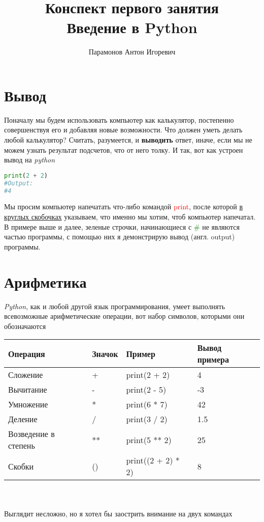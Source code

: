 \documentclass[12pt]{article} %
\newcommand \tab[1][1cm]{\hspace*{#1}}
\begin{document}
\title{Конспект первого занятия\\
	\large Введение в Python}
\author{Парамонов Антон Игоревич}
\maketitle
\section{Вывод}
\tab Поначалу мы будем использовать компьютер как калькулятор, постепенно совершенствуя его и добавляя новые возможности. Что должен уметь делать любой калькулятор? Считать, разумеется, и \textbf{выводить} ответ, иначе, если мы не можем узнать результат подсчетов, что от него толку. И так, вот как устроен вывод на \textit{python}
\begin{lstlisting}[language=Python]
print(2 + 2)
#Output: 
#4
\end{lstlisting}
\tab Мы просим компьютер напечатать что-либо командой \textcolor{red}{print}, после которой \underline{в круглых скобочках} указываем, что именно мы хотим, чтоб компьютер напечатал.\\
\tab В примере выше и далее, зеленые строчки, начинающиеся с \textcolor{green}{\#} не являются частью программы, с помощью них я демонстрирую вывод (англ. output) программы.\\

\section{Арифметика}
\tab \textit{Python}, как и любой другой язык программирования, умеет выполнять всевозможные арифметические операции, вот набор символов, которыми они обозначаются\\
\begin{tabular}{|l|l|l|l|}
	\hline
	Операция & Значок & Пример & Вывод примера\\
	\hline
	\hline
	Сложение & + & print(2 + 2) & 4\\
	\hline
	Вычитание & - & print(2 - 5) & -3\\
	\hline
	Умножение & * & print(6 * 7) & 42\\
	\hline
	Деление & / & print(3 / 2) &  1.5\\
	\hline
	Возведение в степень & ** & print(5 ** 2) & 25\\
	\hline 
	Скобки & () & print((2 + 2) * 2) & 8\\
	\hline
\end{tabular}\\
\\
\tab Выглядит несложно, но я хотел бы заострить внимание на двух командах
\end{document}
